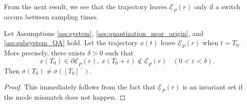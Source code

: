 \documentclass[a4, 11pt]{article}
\begin{document}
From the next result, we see that
the trajectory leaves $\underline{\mathcal{E}}_P(r)$ only if
a switch occurs between sampling times.
\begin{lemma}
\label{lem:cross_to_out}
Let Assumptions \ref{ass:system}, \ref{ass:quantization_near_origin}, and
\ref{ass:subsystem_QA} hold.
Let the trajectory $x(t)$ leave
$\underline{\mathcal{E}}_P(r)$ when $t = T_0$.
More precisely, 
there exists $\delta > 0$ such that
\begin{equation}
\label{eq:x(T_0)_def}
x(T_0) \in \partial \underline{\mathcal{E}}_P(r),~
x(T_0+\varepsilon) \not\in \underline{\mathcal{E}}_P(r)
~~~~ (0 <  \varepsilon < \delta).
\end{equation}
Then $\sigma(T_0) \not= \sigma([T_0]^-)$.
\end{lemma}

\begin{proof}
This immediately follows from the fact that 
$\underline{\mathcal{E}}_P(r)$ is an invariant set
if the mode mismatch does not happen.
\end{proof}
\end{document}

